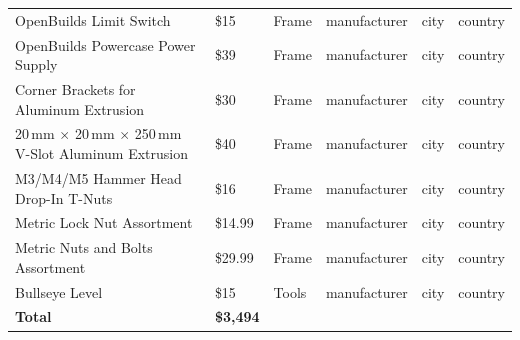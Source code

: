 \begin{table}[p]
\begin{tabular}{ |p{4cm}||p{2cm}|p{2cm}|p{2.5cm}|p{2.5cm}|p{2.5cm}|}
OpenBuilds Limit Switch & \$15 & Frame & manufacturer & city & country \\
OpenBuilds Powercase Power Supply & \$39 & Frame & manufacturer & city & country \\
Corner Brackets for Aluminum Extrusion & \$30 & Frame & manufacturer & city & country \\
20\,mm $\times$ 20\,mm $\times$ 250\,mm V-Slot Aluminum Extrusion & \$40 & Frame & manufacturer & city & country \\
M3/M4/M5 Hammer Head Drop-In T-Nuts & \$16 & Frame & manufacturer & city & country \\
Metric Lock Nut Assortment & \$14.99 & Frame & manufacturer & city & country \\
Metric Nuts and Bolts Assortment & \$29.99 & Frame & manufacturer & city & country \\
Bullseye Level & \$15 & Tools & manufacturer & city & country \\

\hline
\textbf{Total} & \textbf{\$3,494} & \\
\hline

\end{tabular}

\end{table}